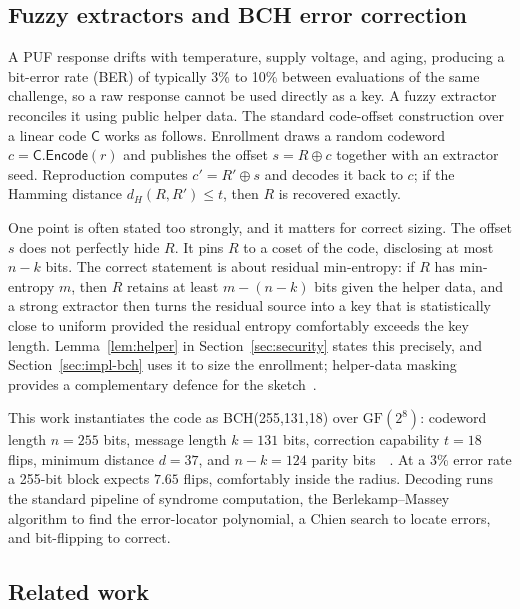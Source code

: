 \documentclass[journal]{IEEEtran}
\begin{document}
\subsection{Fuzzy extractors and BCH error correction}
\label{sec:fe}

A PUF response drifts with temperature, supply voltage, and aging, producing a
bit-error rate (BER) of typically 3\% to 10\% between evaluations of the same
challenge, so a raw response cannot be used directly as a key. A fuzzy
extractor~\cite{dodis_fuzzy,bch_puf_extraction} reconciles it using public
helper data. The standard code-offset construction over a linear code
$\mathsf{C}$ works as follows. Enrollment draws a random codeword
$c = \mathsf{C}.\mathsf{Encode}(r)$ and publishes the offset $s = R \oplus c$
together with an extractor seed. Reproduction computes $c' = R' \oplus s$ and
decodes it back to $c$; if the Hamming distance $d_H(R, R') \le t$, then $R$ is
recovered exactly.

One point is often stated too strongly, and it matters for correct sizing. The
offset $s$ does not perfectly hide $R$. It pins $R$ to a coset of the code,
disclosing at most $n-k$ bits. The correct statement is about residual
min-entropy: if $R$ has min-entropy $m$, then $R$ retains at least $m-(n-k)$
bits given the helper data, and a strong extractor then turns the residual
source into a key that is statistically close to uniform provided the residual
entropy comfortably exceeds the key length. Lemma~\ref{lem:helper} in
Section~\ref{sec:security} states this precisely, and Section~\ref{sec:impl-bch}
uses it to size the enrollment; helper-data masking provides a complementary
defence for the sketch~\cite{helper_data_masking}.

This work instantiates the code as BCH(255,131,18) over $\mathrm{GF}(2^8)$:
codeword length $n = 255$ bits, message length $k = 131$ bits, correction
capability $t = 18$ flips, minimum distance $d = 37$, and $n-k = 124$ parity
bits~~\cite{sram_puf_bch}. At a 3\% error rate a 255-bit block expects $7.65$
flips, comfortably inside the radius. Decoding runs the standard pipeline of
syndrome computation, the Berlekamp--Massey algorithm to find the
error-locator polynomial, a Chien search to locate errors, and bit-flipping to
correct.

\subsection{Related work}
\end{document}
